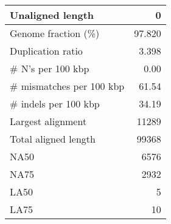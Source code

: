 \documentclass[12pt,a4paper]{article}
\begin{document}
\begin{table}[ht]
\begin{center}
\begin{tabular}{|l*{1}{|r}|}
Unaligned length & 0 \\ \hline
Genome fraction (\%) & 97.820 \\ \hline
Duplication ratio & 3.398 \\ \hline
\# N's per 100 kbp & 0.00 \\ \hline
\# mismatches per 100 kbp & 61.54 \\ \hline
\# indels per 100 kbp & 34.19 \\ \hline
Largest alignment & 11289 \\ \hline
Total aligned length & 99368 \\ \hline
NA50 & 6576 \\ \hline
NA75 & 2932 \\ \hline
LA50 & 5 \\ \hline
LA75 & 10 \\ \hline
\end{tabular}
\end{center}
\end{table}
\end{document}
